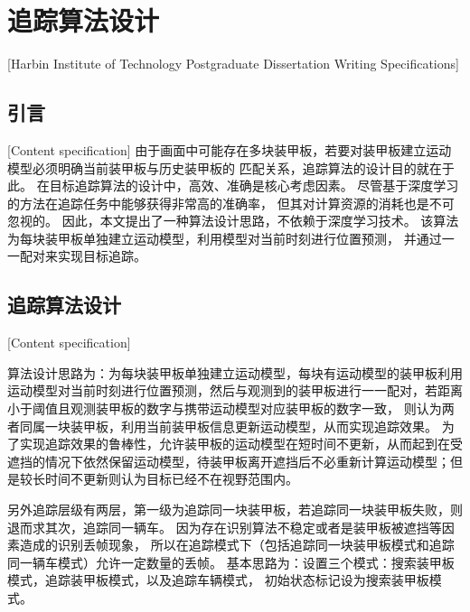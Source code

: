 

\chapter[追踪算法设计]{追踪算法设计}[Harbin Institute of Technology Postgraduate Dissertation Writing Specifications]

\section{引言}[Content specification]
由于画面中可能存在多块装甲板，若要对装甲板建立运动模型必须明确当前装甲板与历史装甲板的
匹配关系，追踪算法的设计目的就在于此。
在目标追踪算法的设计中，高效、准确是核心考虑因素。
尽管基于深度学习的方法在追踪任务中能够获得非常高的准确率，
但其对计算资源的消耗也是不可忽视的。
因此，本文提出了一种算法设计思路，不依赖于深度学习技术。
该算法为每块装甲板单独建立运动模型，利用模型对当前时刻进行位置预测，
并通过一一配对来实现目标追踪。

\section{追踪算法设计}[Content specification]

算法设计思路为：为每块装甲板单独建立运动模型，每块有运动模型的装甲板利用运动模型对当前时刻进行位置预测，然后与观测到的装甲板进行一一配对，若距离小于阈值且观测装甲板的数字与携带运动模型对应装甲板的数字一致，
则认为两者同属一块装甲板，利用当前装甲板信息更新运动模型，从而实现追踪效果。
为了实现追踪效果的鲁棒性，允许装甲板的运动模型在短时间不更新，从而起到在受遮挡的情况下依然保留运动模型，待装甲板离开遮挡后不必重新计算运动模型；但是较长时间不更新则认为目标已经不在视野范围内。
\par

另外追踪层级有两层，第一级为追踪同一块装甲板，若追踪同一块装甲板失败，则退而求其次，追踪同一辆车。
因为存在识别算法不稳定或者是装甲板被遮挡等因素造成的识别丢帧现象，
所以在追踪模式下（包括追踪同一块装甲板模式和追踪同一辆车模式）允许一定数量的丢帧。
基本思路为：设置三个模式：搜索装甲板模式，追踪装甲板模式，以及追踪车辆模式，
初始状态标记设为搜索装甲板模式。

